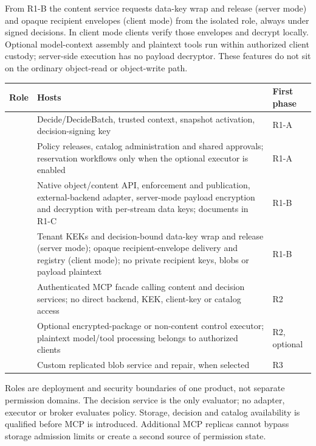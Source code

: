 From R1-B the content service requests data-key wrap and release (server mode) and opaque recipient envelopes (client mode) from the isolated  role, always under signed decisions. In client mode clients verify those envelopes and decrypt locally. Optional model-context assembly and plaintext tools run within authorized client custody; server-side execution has no payload decryptor. These features do not sit on the ordinary object-read or object-write path.
\begin{longtable}{@{}P{0.14\textwidth}P{0.56\textwidth}P{0.14\textwidth}@{}}
\toprule Role & Hosts & First phase\\\midrule\endhead
{} & Decide/DecideBatch, trusted context, snapshot activation, decision-signing key & R1-A\\
 & Policy releases, catalog administration and shared approvals; reservation workflows only when the optional executor is enabled & R1-A\\
 & Native object/content API, enforcement and publication, external-backend adapter, server-mode payload encryption and decryption with per-stream data keys; documents in R1-C & R1-B\\
 & Tenant KEKs and decision-bound data-key wrap and release (server mode); opaque recipient-envelope delivery and registry (client mode); no private recipient keys, blobs or payload plaintext & R1-B\\
 & Authenticated MCP facade calling content and decision services; no direct backend, KEK, client-key or catalog access & R2\\
 & Optional encrypted-package or non-content control executor; plaintext model/tool processing belongs to authorized clients & R2, optional\\
 & Custom replicated blob service and repair, when selected & R3\\
\bottomrule
\end{longtable}
Roles are deployment and security boundaries of one product, not separate permission domains. The decision service is the only evaluator; no adapter, executor or broker evaluates policy. Storage, decision and catalog availability is qualified before MCP is introduced. Additional MCP replicas cannot bypass storage admission limits or create a second source of permission state.

